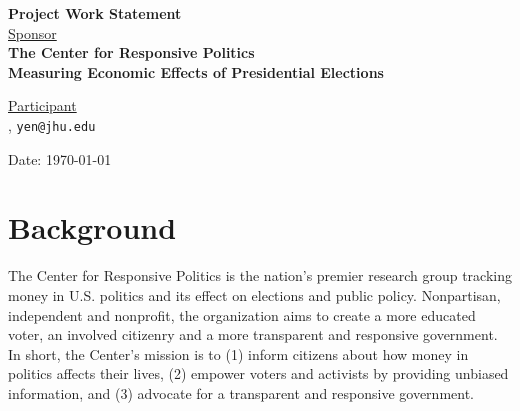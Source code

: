 \documentclass[12pt,letterpaper]{article}
\theoremstyle{definition}
\begin{document}
\def\shiftdowna{0.32in}  %
\def\shiftdownb{0.22in}  %


\begin{center}
\textbf{{\large Project Work Statement}}\\


\vspace \shiftdowna
\underline {Sponsor}\\ 
\vspace{5pt}
\textbf{{\large The Center for Responsive Politics}}\\


\vspace \shiftdowna
\textbf{{\large Measuring Economic Effects of Presidential Elections}}


\vspace{0.35in}
\vspace \shiftdownb
\underline {Participant} \\
\vspace{5pt}
, \texttt{yen@jhu.edu}


\vspace \shiftdowna
Date: \today

\end{center}

\vfill  

\newpage

\section{Background} 
The Center for Responsive Politics is the nation's premier research group tracking money in U.S. politics and its effect on elections and public policy. Nonpartisan, independent and nonprofit, the organization aims to create a more educated voter, an involved citizenry and a more transparent and responsive government. In short, the Center's mission is to (1) inform citizens about how money in politics affects their lives, (2) empower voters and activists by providing unbiased information, and (3) advocate for a transparent and responsive government.
\end{document}
